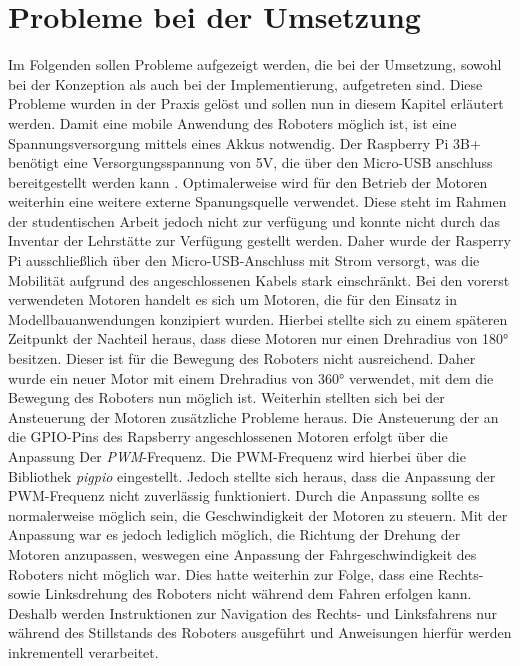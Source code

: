 \section{Probleme bei der Umsetzung}
Im Folgenden sollen Probleme aufgezeigt werden, die bei der Umsetzung, sowohl bei der Konzeption als auch bei der Implementierung, aufgetreten sind. Diese Probleme wurden in der Praxis gelöst und sollen nun in diesem Kapitel erläutert werden.
Damit eine mobile Anwendung des Roboters möglich ist, ist eine Spannungsversorgung mittels eines Akkus notwendig. Der Raspberry Pi 3B+ benötigt eine Versorgungsspannung von 5V, die  über den Micro-USB anschluss bereitgestellt werden kann \cite{raspberrypi-docs}. Optimalerweise wird für den Betrieb der Motoren weiterhin eine weitere externe Spanungsquelle verwendet. Diese steht im Rahmen der studentischen Arbeit jedoch nicht zur verfügung und konnte nicht durch das Inventar der Lehrstätte zur Verfügung gestellt werden. Daher wurde der Rasperry Pi ausschließlich über den Micro-USB-Anschluss mit Strom versorgt, was die Mobilität aufgrund des angeschlossenen Kabels stark einschränkt. 
Bei den vorerst verwendeten Motoren handelt es sich um Motoren, die für den Einsatz in Modellbauanwendungen konzipiert wurden. Hierbei stellte sich zu einem späteren Zeitpunkt der Nachteil heraus, dass diese Motoren nur einen Drehradius von 180° besitzen. Dieser ist für die Bewegung des Roboters nicht ausreichend. Daher wurde ein neuer Motor mit einem Drehradius von 360° verwendet, mit dem die Bewegung des Roboters nun möglich ist.
Weiterhin stellten sich bei der Ansteuerung der Motoren zusätzliche Probleme heraus. Die Ansteuerung der an die GPIO-Pins des Rapsberry angeschlossenen Motoren erfolgt über die Anpassung Der \textit{PWM}-Frequenz. Die PWM-Frequenz wird hierbei über die Bibliothek \textit{pigpio} eingestellt. Jedoch stellte sich heraus, dass die Anpassung der PWM-Frequenz nicht zuverlässig funktioniert. Durch die Anpassung sollte es normalerweise möglich sein, die Geschwindigkeit der Motoren zu steuern. Mit der Anpassung war es jedoch lediglich möglich, die Richtung der Drehung der Motoren anzupassen, weswegen eine Anpassung der Fahrgeschwindigkeit des Roboters nicht möglich war. Dies hatte weiterhin zur Folge, dass eine Rechts- sowie Linksdrehung des Roboters nicht während dem Fahren erfolgen kann. Deshalb werden Instruktionen zur Navigation des Rechts- und Linksfahrens nur während des Stillstands des Roboters ausgeführt und Anweisungen hierfür werden inkrementell verarbeitet.